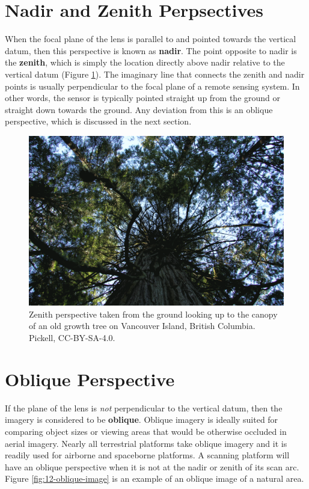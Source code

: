 \documentclass[
]{book}
\begin{document}
\section{Nadir and Zenith Perpsectives}\label{nadir-and-zenith-perpsectives}

When the focal plane of the lens is parallel to and pointed towards the vertical datum, then this perspective is known as \textbf{nadir}. The point opposite to nadir is the \textbf{zenith}, which is simply the location directly above nadir relative to the vertical datum (Figure \ref{fig:12-zenith-image}). The imaginary line that connects the zenith and nadir points is usually perpendicular to the focal plane of a remote sensing system. In other words, the sensor is typically pointed straight up from the ground or straight down towards the ground. Any deviation from this is an oblique perspective, which is discussed in the next section.

\begin{figure}
\includegraphics[width=0.9\linewidth]{images/12-zenith-image} \caption{Zenith perspective taken from the ground looking up to the canopy of an old growth tree on Vancouver Island, British Columbia. Pickell, CC-BY-SA-4.0.}\label{fig:12-zenith-image}
\end{figure}

\section{Oblique Perspective}\label{oblique-perspective}

If the plane of the lens is \emph{not} perpendicular to the vertical datum, then the imagery is considered to be \textbf{oblique}. Oblique imagery is ideally suited for comparing object sizes or viewing areas that would be otherwise occluded in aerial imagery. Nearly all terrestrial platforms take oblique imagery and it is readily used for airborne and spaceborne platforms. A scanning platform will have an oblique perspective when it is not at the nadir or zenith of its scan arc. Figure \ref{fig:12-oblique-image} is an example of an oblique image of a natural area.
\end{document}
